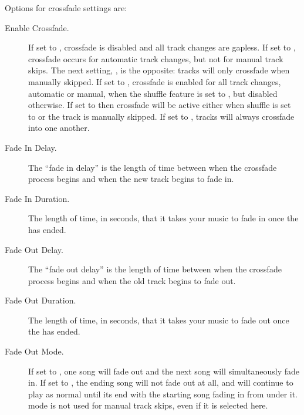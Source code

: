 {{    Options for crossfade settings are:
    \begin{description}
      \item[Enable Crossfade.] If set to , crossfade is disabled
        and all track changes are gapless.  If set to
        , crossfade occurs for automatic
        track changes, but not for manual track skips.  The next setting,
        , is the opposite: tracks will only
        crossfade when manually skipped.  If set to , crossfade
        is enabled for all track changes, automatic or manual, when the shuffle
        feature is set to , but disabled otherwise.  If set to
         then crossfade will be active
        either when shuffle is set to  or the track is manually
        skipped.  If set to , tracks will always crossfade into
        one another.
      \item[Fade In Delay.] The ``fade in delay'' is the length of time between
        when the crossfade process begins and when the new track begins to fade
        in.
      \item[Fade In Duration.] The length of time, in seconds, that it takes
        your music to fade in once the  has ended.
      \item[Fade Out Delay.] The ``fade out delay'' is the length of time
        between when the crossfade process begins and when the old track begins
        to fade out.
      \item[Fade Out Duration.] The length of time, in seconds, that it takes
        your music to fade out once the  has ended.
      \item[Fade Out Mode.] If set to , one song will fade
        out and the next song will simultaneously fade in. If set to 
        , the ending song will not fade out at all, and will
        continue to play as normal until its end with the starting song fading
        in from under it.  mode is not used for manual track skips,
        even if it is selected here.
      \end{description}
      

}}
